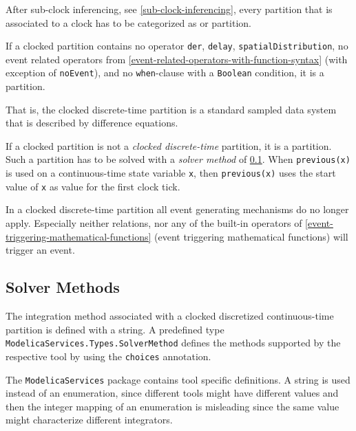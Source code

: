 After sub-clock inferencing, see \cref{sub-clock-inferencing}, every partition that is associated to a clock has to be categorized as  or  partition.

If a clocked partition contains no operator \lstinline!der!, \lstinline!delay!, \lstinline!spatialDistribution!, no event related operators from \cref{event-related-operators-with-function-syntax} (with exception of \lstinline!noEvent!), and no \lstinline!when!-clause with a \lstinline!Boolean! condition, it is a  partition.

\begin{nonnormative}
That is, the clocked discrete-time partition is a standard sampled data system that is described by difference equations.
\end{nonnormative}

If a clocked partition is not a \emph{clocked discrete-time} partition, it is a  partition.
Such a partition has to be solved with a \emph{solver method} of \cref{solver-methods}.
When \lstinline!previous(x)! is used on a continuous-time state variable \lstinline!x!, then \lstinline!previous(x)! uses the start value of \lstinline!x! as value for the first clock tick.

In a clocked discrete-time partition all event generating mechanisms do no longer apply.
Especially neither relations, nor any of the built-in operators of \cref{event-triggering-mathematical-functions} (event triggering mathematical functions) will trigger an event.

\subsection{Solver Methods}\label{solver-methods}

The integration method associated with a clocked discretized continuous-time partition is defined with a string.
A predefined type \lstinline!ModelicaServices.Types.SolverMethod! defines the methods supported by the respective tool by using the \lstinline!choices! annotation.

\begin{nonnormative}
The \lstinline!ModelicaServices! package contains tool specific definitions.  A string is used instead of an enumeration, since different tools might have different values and then the
integer mapping of an enumeration is misleading since the same value might characterize different integrators.
\end{nonnormative}

